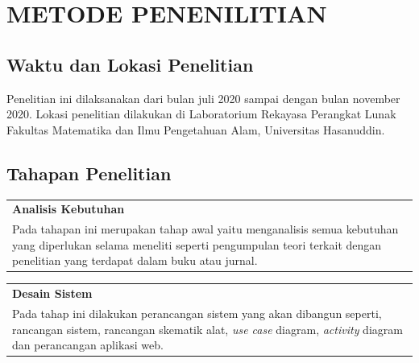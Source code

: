 \chapter{METODE PENENILITIAN}

\setlength{\intextsep}{0cm}

\section{Waktu dan Lokasi Penelitian}
Penelitian ini dilaksanakan dari bulan juli 2020 sampai dengan bulan november 2020. Lokasi penelitian dilakukan di Laboratorium Rekayasa Perangkat Lunak Fakultas Matematika dan Ilmu Pengetahuan Alam, Universitas Hasanuddin.

\section{Tahapan Penelitian}

\begin{table} [H]
    \begin{tabular}{|>{\centering\arraybackslash}m{1\linewidth} |}
        \hline
        \textbf{Analisis Kebutuhan}\\ 
        Pada tahapan ini merupakan tahap awal yaitu menganalisis semua kebutuhan yang diperlukan selama meneliti seperti pengumpulan teori terkait dengan penelitian yang terdapat dalam buku atau jurnal.\\
        \hline
    \end{tabular}
\end{table}

\begin{center}
    \bigg\downarrow
\end{center}

\begin{table} [H]
    \begin{tabular}{|>{\centering\arraybackslash}m{1\linewidth} |}
        \hline
        \textbf{Desain Sistem}\\ 
        Pada tahap ini dilakukan perancangan sistem yang akan dibangun seperti, rancangan sistem, rancangan skematik alat, \textit{use case} diagram, \textit{activity} diagram dan perancangan aplikasi web.\\
        \hline
    \end{tabular}
\end{table}

\begin{center}
    \bigg\downarrow
\end{center}

